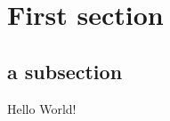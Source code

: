 \documentclass{article}
\begin{document}
\section*{First section}
\subsection*{a subsection}
Hello World!
\end{document}
